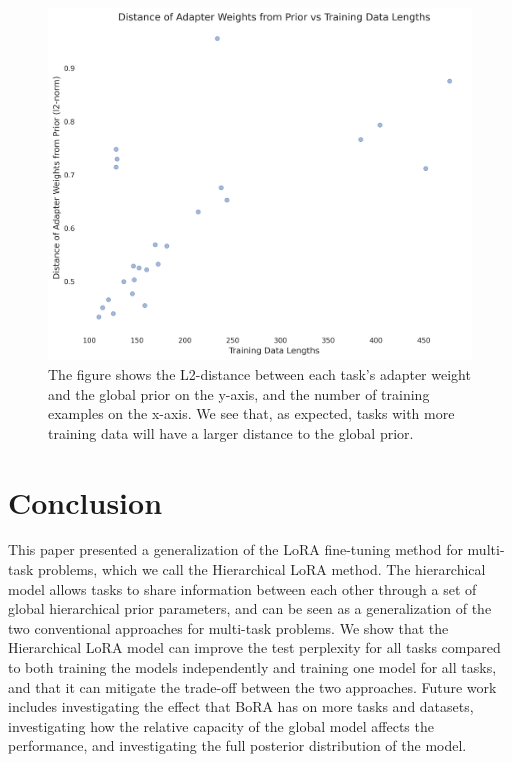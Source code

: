 \documentclass{article}
\begin{document}
\begin{figure}[h]
    \centering
    \includegraphics[width=\textwidth]{figures/weights_vs_data_lengths.png}
    \caption{The figure shows the L2-distance between each task's adapter weight and the global prior on the y-axis, and the number of training examples on the x-axis. We see that, as expected, tasks with more training data will have a larger distance to the global prior.}
    \label{fig:weights_vs_datalen} 
\end{figure}

\section{Conclusion}
This paper presented a generalization of the LoRA fine-tuning method for multi-task problems, which we call the Hierarchical LoRA method. The hierarchical model allows tasks to share information between each other through a set of global hierarchical prior parameters, and can be seen as a generalization of the two conventional approaches for multi-task problems. We show that the Hierarchical LoRA model can improve the test perplexity for all tasks compared to both training the models independently and training one model for all tasks, and that it can mitigate the trade-off between the two approaches.
Future work includes investigating the effect that BoRA has on more tasks and datasets, investigating how the relative capacity of the global model affects the performance, and investigating the full posterior distribution of the model.
\end{document}
